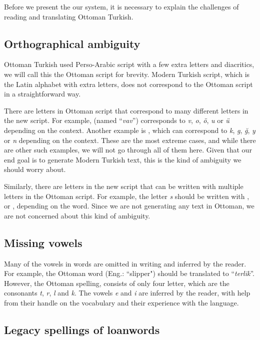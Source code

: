 \documentclass[10pt,twocolumn]{article}
\theoremstyle{nonumberplain}
\newcommand{\otto}[1]{\RLE{\ottoman{}\Large{}#1}}
\newcommand{\word}[1]{``\emph{#1}''}
\begin{document}
Before we present the our system, it is necessary to explain the challenges of reading and translating Ottoman Turkish.

\subsection{Orthographical ambiguity}

Ottoman Turkish used Perso-Arabic script with a few extra letters and
diacritics, we will call this the Ottoman script for brevity. Modern Turkish
script, which is the Latin alphabet with extra letters, does not correspond to
the Ottoman script in a straightforward way.

There are letters in Ottoman script that correspond to many different letters in the new script.
For example, \otto{و} (named \word{vav}) corresponds to \emph{v}, \emph{o}, \emph{ö}, \emph{u} or \emph{ü} depending on the context.
Another example is \otto{ك}, which can correspond to \emph{k}, \emph{g}, \emph{ğ}, \emph{y} or \emph{n} depending on the context.
These are the most extreme cases, and while there are other such examples, we
will not go through all of them here.  Given that our end goal is to generate
Modern Turkish text, this is the kind of ambiguity we should worry about.

Similarly, there are letters in the new script that can be written with multiple letters in the Ottoman script. For example, the letter \emph{s} should be written with \otto{س}, \otto{ص} or \otto{ث}, depending on the word. Since we are not generating any text in Ottoman, we are not concerned about this kind of ambiguity.

\subsection{Missing vowels}

Many of the vowels in words are omitted in writing and inferred by the reader.
For example, the Ottoman word \otto{ترلك} (Eng.: ``slipper") should be
translated to \word{terlik}.
However, the Ottoman spelling, consists of only four letter, which are the
consonants \emph{t}, \emph{r}, \emph{l} and \emph{k}.
The vowels \emph{e} and \emph{i} are inferred by the reader, with help from
their handle on the vocabulary and their experience with the language.

\subsection{Legacy spellings of loanwords}
\end{document}
